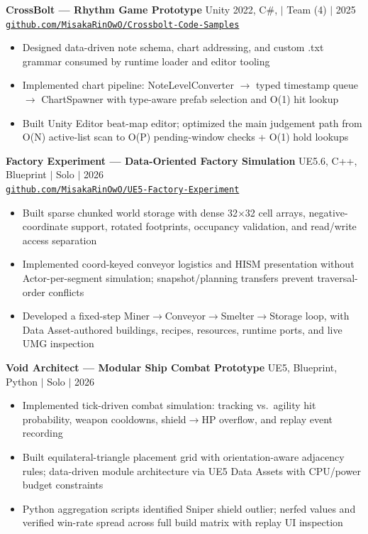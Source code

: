 \documentclass[letterpaper,10pt]{article}
\begin{document}
\textbf{CrossBolt --- Rhythm Game Prototype} \hfill Unity 2022, C\#, $|$ Team (4) $|$ 2025\\
\href{https://github.com/MisakaRinOwO/Crossbolt-Code-Samples}{\texttt{github.com/MisakaRinOwO/Crossbolt-Code-Samples}}
\begin{itemize}
  \item Designed data-driven note schema, chart addressing, and custom .txt grammar consumed by runtime loader and editor tooling
  \item Implemented chart pipeline: NoteLevelConverter $\rightarrow$ typed timestamp queue $\rightarrow$ ChartSpawner with type-aware prefab selection and O(1) hit lookup
  \item Built Unity Editor beat-map editor; optimized the main judgement path from O(N) active-list scan to O(P) pending-window checks + O(1) hold lookups
\end{itemize}

\smallskip

\textbf{Factory Experiment --- Data-Oriented Factory Simulation} \hfill UE5.6, C++, Blueprint $|$ Solo $|$ 2026\\
\href{https://github.com/MisakaRinOwO/UE5-Factory-Experiment}{\texttt{github.com/MisakaRinOwO/UE5-Factory-Experiment}}
\begin{itemize}
  \item Built sparse chunked world storage with dense 32$\times$32 cell arrays, negative-coordinate support, rotated footprints, occupancy validation, and read/write access separation
  \item Implemented coord-keyed conveyor logistics and HISM presentation without Actor-per-segment simulation; snapshot/planning transfers prevent traversal-order conflicts
  \item Developed a fixed-step Miner$\rightarrow$Conveyor$\rightarrow$Smelter$\rightarrow$Storage loop, with Data Asset-authored buildings, recipes, resources, runtime ports, and live UMG inspection
\end{itemize}

\smallskip

\textbf{Void Architect --- Modular Ship Combat Prototype} \hfill UE5, Blueprint, Python $|$ Solo $|$ 2026
\begin{itemize}
  \item Implemented tick-driven combat simulation: tracking vs.\ agility hit probability, weapon cooldowns, shield$\rightarrow$HP overflow, and replay event recording
  \item Built equilateral-triangle placement grid with orientation-aware adjacency rules; data-driven module architecture via UE5 Data Assets with CPU/power budget constraints
  \item Python aggregation scripts identified Sniper shield outlier; nerfed values and verified win-rate spread across full build matrix with replay UI inspection
\end{itemize}
\end{document}
